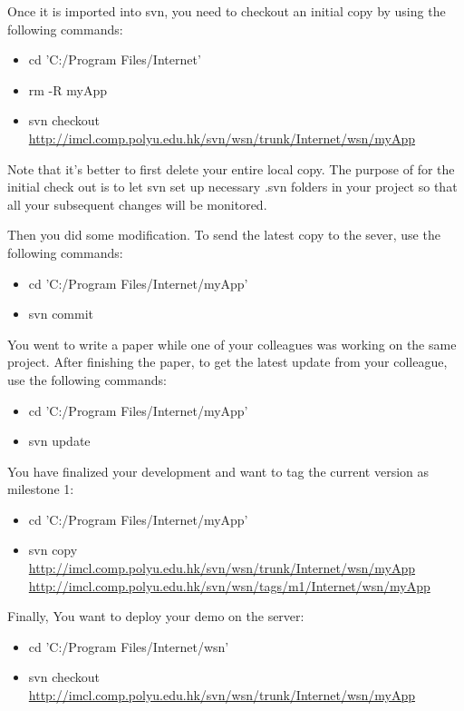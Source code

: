Once it is imported into svn, you need to checkout an initial copy by using the following commands:
\begin{itemize}
\item cd 'C:/Program Files/Internet'
\item rm -R myApp
\item svn checkout \url{http://imcl.comp.polyu.edu.hk/svn/wsn/trunk/Internet/wsn/myApp}
\end{itemize}
Note that it's better to first delete your entire local copy. The purpose of for the initial check out is to let svn set up necessary .svn folders in your project so that all your subsequent changes will be monitored.

Then you did some modification. To send the latest copy to the sever, use the following commands:
\begin{itemize}
\item cd 'C:/Program Files/Internet/myApp'
\item svn commit
\end{itemize}

You went to write a paper while one of your colleagues was working on the same project. After finishing the paper, to get the latest update from your colleague, use the following commands:
\begin{itemize}
\item cd 'C:/Program Files/Internet/myApp'
\item svn update
\end{itemize}

You have finalized your development and want to tag the current version as milestone 1:
\begin{itemize}
\item cd 'C:/Program Files/Internet/myApp'
\item svn copy \url{http://imcl.comp.polyu.edu.hk/svn/wsn/trunk/Internet/wsn/myApp} \url{http://imcl.comp.polyu.edu.hk/svn/wsn/tags/m1/Internet/wsn/myApp}
\end{itemize}

Finally, You want to deploy your demo on the server:
\begin{itemize}
\item cd 'C:/Program Files/Internet/wsn'
\item svn checkout \url{http://imcl.comp.polyu.edu.hk/svn/wsn/trunk/Internet/wsn/myApp}
\end{itemize}